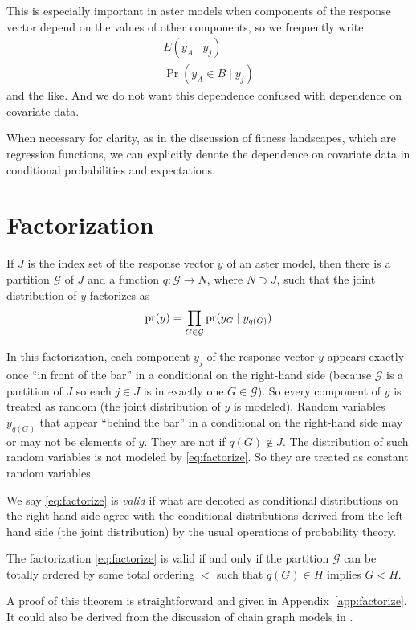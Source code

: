 This is especially important in aster models when components of the response
vector depend on the values of other components, so we frequently write
\begin{gather*}
   E(y_A \mid y_j)
   \\
   \Pr(y_A \in B \mid y_j)
\end{gather*}
and the like.  And we do not want this dependence confused with dependence
on covariate data.

When necessary for clarity, as in the discussion of fitness landscapes,
which are regression functions,
we can explicitly denote the dependence on covariate data in conditional
probabilities and expectations.

\section{Factorization}
\label{sec:factorization}

If $J$ is the index set of the response vector $y$ of an aster model,
then there is a partition $\mathcal{G}$ of $J$
and a function $q : \mathcal{G} \to N$, where $N \supset J$, such that
the joint distribution of $y$ factorizes as
\begin{equation} \label{eq:factorize}
   \operatorname{pr}(y) = \prod_{G \in \mathcal{G}} \operatorname{pr}(y_G \mid y_{q(G)})
\end{equation}

In this factorization, each component $y_j$ of the response vector $y$
appears exactly once ``in front of the bar'' in a conditional on
the right-hand side (because $\mathcal{G}$ is a partition of $J$ so
each $j \in J$ is in exactly one $G \in \mathcal{G}$).
So every component of $y$ is treated as random (the joint distribution
of $y$ is modeled).
Random variables $y_{q(G)}$ that appear ``behind the bar'' in a conditional
on the right-hand side may or may not be elements of $y$.  They are not
if $q(G) \notin J$.  The distribution of such random variables is not
modeled by \eqref{eq:factorize}.  So they are treated as constant random
variables.

We say \eqref{eq:factorize} is \emph{valid} if what are denoted as
conditional distributions on the right-hand side agree with the conditional
distributions derived from the left-hand side (the joint distribution) by
the usual operations of probability theory.
\begin{theorem} \label{th:factorize}
The factorization \eqref{eq:factorize} is valid if and only if
the partition $\mathcal{G}$ can be totally ordered
by some total ordering $<$ such that $q(G) \in H$ implies $G < H$.
\end{theorem}
A proof of this theorem is straightforward and given
in Appendix~\ref{app:factorize}.
It could also be derived from the discussion of chain graph models
in \citet[equation~3.23]{lauritzen}.

